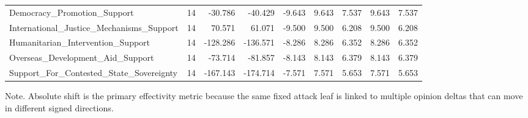 \begin{table}[htbp]
\begin{threeparttable}
\begin{adjustbox}{max width=\linewidth}
\begin{tabular}{lrrrrrrrr}
Democracy\_Promotion\_Support & 14 & -30.786 & -40.429 & -9.643 & 9.643 & 7.537 & 9.643 & 7.537 \\
International\_Justice\_Mechanisms\_Support & 14 & 70.571 & 61.071 & -9.500 & 9.500 & 6.208 & 9.500 & 6.208 \\
Humanitarian\_Intervention\_Support & 14 & -128.286 & -136.571 & -8.286 & 8.286 & 6.352 & 8.286 & 6.352 \\
Overseas\_Development\_Aid\_Support & 14 & -73.714 & -81.857 & -8.143 & 8.143 & 6.379 & 8.143 & 6.379 \\
Support\_For\_Contested\_State\_Sovereignty & 14 & -167.143 & -174.714 & -7.571 & 7.571 & 5.653 & 7.571 & 5.653 \\
\bottomrule
\end{tabular}
\end{adjustbox}
\begin{tablenotes}[flushleft]
\footnotesize
\item Note. Absolute shift is the primary effectivity metric because the same fixed attack leaf is linked to multiple opinion deltas that can move in different signed directions.
\end{tablenotes}
\end{threeparttable}
\end{table}